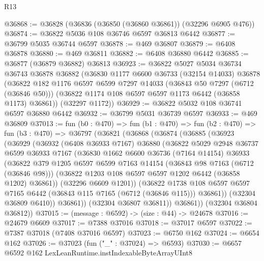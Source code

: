 \begin{lexlean}{R13}
\begin{coremodule}
@36868 := @36828 (@36836 (@36850 (@36860 @36861)) (@32296 @6905 @476))
@36874 := @36822 @5036 @108 @36746 @6597 @36813 @6442
@36877 := @36799 @5035 @36744 @6597
@36878 := @469 @36807
@36879 := @6408 @36878
@36880 := @469 @36811
@36882 := @6408 @36880 @6442
@36885 := @36877 (@36879 @36882) @36813
@36923 := @36822
    @5027
    @5034
    @36734
    @36743
    @36878
    @36882
    (@36830
      @1177
      @6600
      @36733
      (@32154 @14033)
      @36878
      (@36822
        @182
        @1176
        @6597
        @6599
        @7297
        @14033
        (@36843 @50 @7297 (@6712 (@36846 @50)))
        (@36822 @1174 @108 @6597 @6597 @1173 @6442 (@36858 @1173) @36861))
      (@32297 @1172))
@36929 := @36822 @5032 @108 @36741 @6597 @36880 @6442
@36932 := @36799 @5031 @36739 @6597
@36933 := @469 @36809
@37013 := fun (b0 : @470) =>
  fun (b1 : @470) =>
  fun (b2 : @470) =>
  fun (b3 : @470) =>
  @36797
    (@36821
      (@36868
        (@36874
          (@36885
            (@36923
              (@36929
                (@36932
                  (@6408 @36933 @7167)
                  @36880
                  (@36822
                    @5029
                    @2948
                    @36737
                    @6599
                    @36933
                    @7167
                    (@36830
                      @1662
                      @6600
                      @36736
                      (@7164 @14154)
                      @36933
                      (@36822
                        @379
                        @1205
                        @6597
                        @6599
                        @7163
                        @14154
                        (@36843 @98 @7163 (@6712 (@36846 @98)))
                        (@36822 @1203 @108 @6597 @6597 @1202 @6442 (@36858 @1202) @36861))
                      (@32296 @6609 @1201))
                    (@36822
                      @1738
                      @108
                      @6597
                      @6597
                      @7165
                      @6442
                      (@36843 @115 @7165 (@6712 (@36846 @115)))
                      @36861))
                  (@32304 @36809 @6410))
                @36861))
            (@32304 @36807 @36811))
          @36861))
      (@32304 @36804 @36812))
@37015 := (message : @6592) -> (size : @44) -> @24678
@37016 := @24679 @6609
@37017 := @7388 @37016
@37018 := @37017 @6597
@37022 := @7387 @37018 (@7408 @37016 @6597)
@37023 := @6750 @162
@37024 := @6654 @162
@37026 := @37023 (fun ("_" : @37024) => @6593)
@37030 := @6657 @6592 @162 LexLeanRuntime.instIndexableByteArrayUInt8

\end{coremodule}
\end{lexlean}

